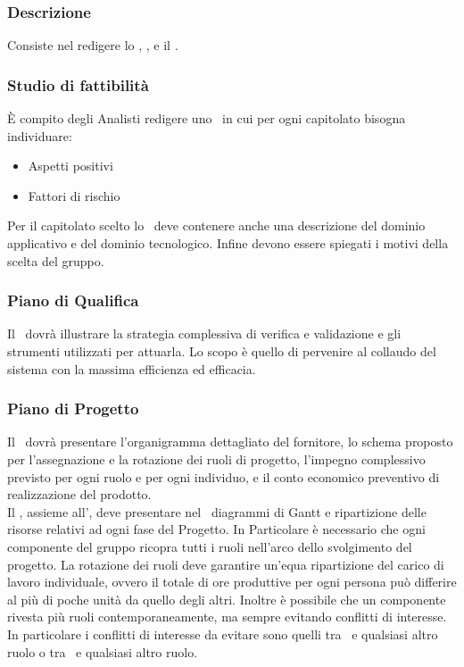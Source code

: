 \documentclass[12pt,a4paper]{article}
\begin{document}
\subsubsection{Descrizione}
Consiste nel redigere lo \SdF, \PdQ, e il \PdP.

\subsubsection{Studio di fattibilità}
È compito degli Analisti redigere uno \SdF\ in cui per ogni capitolato bisogna individuare:
\begin{itemize}
	\item Aspetti positivi
	\item Fattori di rischio
\end{itemize}
Per il capitolato scelto lo \SdF\ deve contenere anche una descrizione del dominio applicativo e del dominio tecnologico. Infine devono essere spiegati i motivi della scelta del gruppo.

\subsubsection{Piano di Qualifica}
Il \PdQ\ dovrà illustrare la strategia complessiva di verifica e validazione e gli strumenti utilizzati per attuarla. Lo scopo è quello di pervenire al collaudo del sistema con la massima efficienza ed efficacia.

\subsubsection{Piano di Progetto} %
Il \PdP\ dovrà presentare l'organigramma dettagliato del fornitore, lo schema proposto per l'assegnazione e la rotazione dei ruoli di progetto, l'impegno complessivo previsto per ogni ruolo e per ogni individuo, e il conto economico preventivo di realizzazione del prodotto.\\
Il \PM, assieme all'\AM, deve presentare nel \PdP\ diagrammi di Gantt e ripartizione delle risorse relativi ad ogni fase del Progetto. In Particolare è necessario che ogni componente del gruppo ricopra tutti i ruoli nell'arco dello svolgimento del progetto. La rotazione dei ruoli deve garantire un'equa ripartizione del carico di lavoro individuale, ovvero il totale di ore produttive per ogni persona può differire al più di poche unità da quello degli altri. Inoltre è possibile che un componente rivesta più ruoli contemporaneamente, ma sempre evitando conflitti di interesse. In particolare i conflitti di interesse da evitare sono quelli tra \PM\ e qualsiasi altro ruolo o tra \VR\ e qualsiasi altro ruolo.
\end{document}

